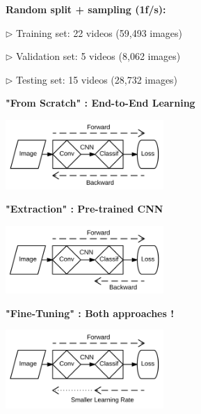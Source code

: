 \documentclass[landscape,a0paper,fontscale=0.292]{baposter}
\begin{document}
\begin{poster}
{\textbf{Random split + sampling (1f/s):}

$\triangleright$ Training set: 22 videos (59,493 images)

$\triangleright$ Validation set: 5 videos (8,062 images)

$\triangleright$ Testing set: 15 videos (28,732 images)

\vspace{.1cm}

\textbf{"From Scratch" : End-to-End Learning}

\vspace{-.4cm}

\begin{center}
\includegraphics[width=6cm]{../slides/images/FromScratch.png}
\end{center}

\vspace{-.4cm}

\textbf{"Extraction" : Pre-trained CNN}

\vspace{-.4cm}

\begin{center}
\includegraphics[width=6cm]{../slides/images/Extraction.png}
\end{center}

\vspace{-.4cm}

\textbf{"Fine-Tuning" : Both approaches !}

\vspace{-.4cm}

\begin{center}
\includegraphics[width=6cm]{../slides/images/FineTuning.png}
\end{center}



}
\end{poster}
\end{document}
